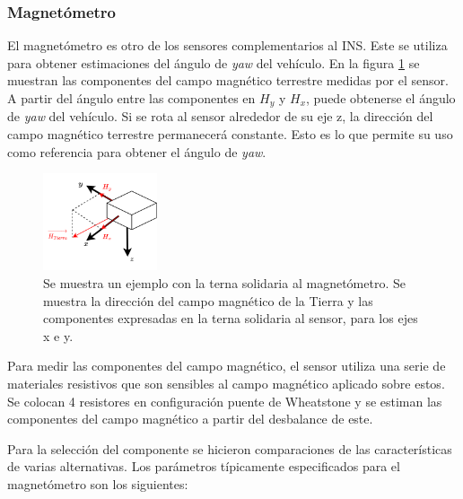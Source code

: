 \subsubsection{Magnetómetro}

El magnetómetro es otro de los sensores complementarios al INS. Este se utiliza para obtener estimaciones del ángulo de \textit{yaw} del vehículo. %
En la figura \ref{fig:magnetometro_H_tierra} se muestran las componentes del campo magnético terrestre medidas por el sensor. A partir del ángulo entre las componentes en $H_y$ y $H_x$, puede obtenerse el ángulo de \textit{yaw} del vehículo. Si se rota al sensor alrededor de su eje z, la dirección del campo magnético terrestre permanecerá constante. Esto es lo que permite su uso como referencia para obtener el ángulo de \textit{yaw}.


\begin{figure}[H]
    \centering
    \includegraphics[width=0.3\textwidth]{img/magnetometro_H_tierra.png}
    \caption{Se muestra un ejemplo con la terna solidaria al magnetómetro. Se muestra la dirección del campo magnético de la Tierra y las componentes expresadas en la terna solidaria al sensor, para los ejes x e y.}
    \label{fig:magnetometro_H_tierra}
\end{figure}

Para medir las componentes del campo magnético, el sensor utiliza una serie de materiales resistivos que son sensibles al campo magnético aplicado sobre estos. Se colocan 4 resistores en configuración puente de Wheatstone y se estiman las componentes del campo magnético a partir del desbalance de este.

Para la selección del componente se hicieron comparaciones de las características de varias alternativas. Los parámetros típicamente especificados para el magnetómetro son los siguientes:

